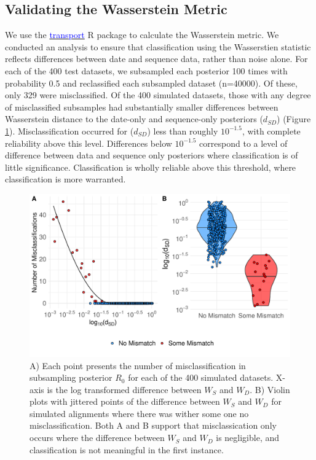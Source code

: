 \documentclass{article}
\begin{document}
\subsection*{Validating the Wasserstein Metric}
We use the \href{https://www.rdocumentation.org/packages/transport/versions/0.12-2/topics/wasserstein1d}{\textcolor{blue}{transport}} R package to calculate the Wasserstein metric. We conducted an analysis to ensure that classification using the Wasserstien statistic reflects differences between date and sequence data, rather than noise alone. For each of the 400 test datasets, we subsampled each posterior 100 times with probability 0.5 and reclassified each subsampled dataset (n=40000). Of these, only 329 were misclassified. Of the 400 simulated datasets, those with any degree of misclassified subsamples had substantially smaller differences between Wasserstein distance to the date-only and sequence-only posteriors ($d_{SD}$) (Figure \ref{fig:validateW}). Misclassification occurred for ($d_{SD}$) less than roughly $10^{-1.5}$, with complete reliability above this level. Differences below $10^{-1.5}$ correspond to a level of difference between data and sequence only posteriors where classification is of little significance. Classification is wholly reliable above this threshold, where classification is more warranted.

\renewcommand{\thefigure}{S\arabic{figure}}
\setcounter{figure}{0}

\begin{figure}[H]
\centering
\includegraphics[width=1\linewidth]{figures/errorWasserstein.pdf}
\caption{A) Each point presents the number of misclassification in subsampling posterior $R_0$ for each of the 400 simulated datasets. X-axis is the log transformed difference between $W_S$ and $W_D$. B) Violin plots with jittered points of the difference between $W_S$ and $W_D$ for simulated alignments where there was wither some one no misclassification. Both A and B support that misclassication only occurs where the difference between $W_S$ and $W_D$ is negligible, and classification is not meaningful in the first instance.}
\label{fig:validateW}
\end{figure}
\end{document}
